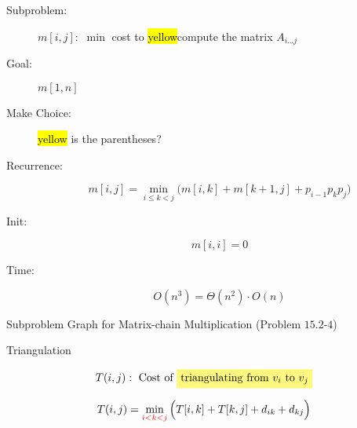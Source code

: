 
\begin{frame}{}
  \centerline{\LARGE {}}

  \vspace{0.50cm}
\end{frame}

\begin{frame}{}
  \begin{description}
    \item[Subproblem:] $m[i,j]:$ $\min$ cost to \hl{yellow}{compute the matrix $A_{i \dots j}$}
    \item[Goal:] $m[1,n]$
      \pause
      \vspace{0.30cm}
    \item[Make Choice:] \hl{yellow}{ is the {\it {}} parentheses?}
    \item[Recurrence:] 
      \[
	m[i,j] = \min_{i \le k <j} \Big(m[i,k] + m[k+1,j] + p_{i-1}p_{k}p_{j}\Big)
      \]
      \pause
    \item[Init:]
      \[
	m[i,i] = 0
      \]
      \pause
    \item[Time:] 
      \[
	O(n^3) = \Theta(n^2) \cdot O(n)
      \]
  \end{description}
\end{frame}

\begin{frame}{}
  \begin{exampleblock}{Subproblem Graph for Matrix-chain Multiplication (Problem $15.2$-$4$)}
  \end{exampleblock}
\end{frame}

\begin{frame}{}
  \begin{exampleblock}{Triangulation}

  \end{exampleblock}

  \[
    T(i,j): \text{ Cost of \hl{yellow}{triangulating from $v_i$ to $v_j$}}
  \]

  \[
    T(i,j) = \min_{\textcolor{red}{i < k < j}} \Big(T[i,k] + T[k,j] + d_{ik} + d_{kj} \Big)
  \]
\end{frame}

\begin{frame}{}
\end{frame}
